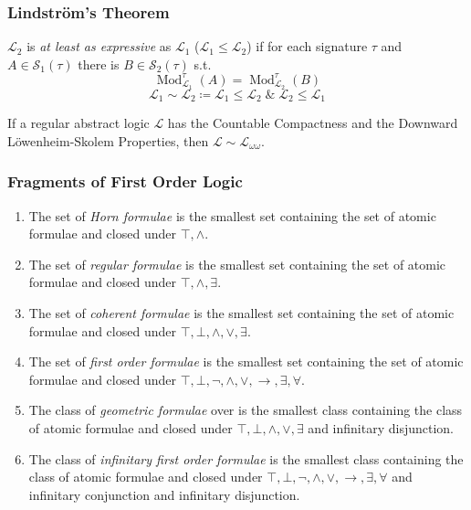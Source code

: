 \documentclass[UTF8,aspectratio=43,11pt,colorlinks,compress,openany]{beamer}%
\begin{document}
\begin{frame}\frametitle{Lindstr\"om's Theorem}
	\begin{definition}
		$\mathcal{L}_2$ is \emph{at least as expressive} as $\mathcal{L}_1$ ($\mathcal{L}_1\leq \mathcal{L}_2$) if for each signature $\tau$ and $A\in \mathcal{S}_1(\tau)$ there is $B\in \mathcal{S}_2(\tau)$ s.t.
		\[\operatorname{Mod}_{\mathcal{L}_1}^\tau(A)=\operatorname{Mod}_{\mathcal{L}_2}^\tau(B)\]
		\[\mathcal{L}_1\sim\mathcal{L}_2\coloneqq \mathcal{L}_1\leq\mathcal{L}_2\;\&\;\mathcal{L}_2\leq\mathcal{L}_1\]
	\end{definition}
	\begin{theorem}
		If a regular abstract logic $\mathcal{L}$ has the Countable Compactness and the Downward L\"owenheim-Skolem Properties, then $\mathcal{L}\sim\mathcal{L}_{\omega\omega}$.
	\end{theorem}
\end{frame}

\begin{frame}\frametitle{Fragments of First Order Logic}
\begin{enumerate}
	\item The set of \emph{Horn formulae} is the smallest set containing the set of atomic formulae and closed under $\top,\wedge$.
	\item The set of \emph{regular formulae} is the smallest set containing the set of atomic formulae and closed under $\top,\wedge,\exists$.
	\item The set of \emph{coherent formulae} is the smallest set containing the set of atomic formulae and closed under $\top,\bot,\wedge,\vee,\exists$.
	\item The set of \emph{first order formulae} is the smallest set containing the set of atomic formulae and closed under $\top,\bot,\neg,\wedge,\vee,\to,\exists,\forall$.
	\item The class of \emph{geometric formulae} over is the smallest class containing the class of atomic formulae and closed under $\top,\bot,\wedge,\vee,\exists$ and infinitary disjunction.
	\item The class of \emph{infinitary first order formulae} is the smallest class containing the class of atomic formulae and closed under $\top,\bot,\neg,\wedge,\vee,\to,\exists,\forall$ and infinitary conjunction and infinitary disjunction.
\end{enumerate}
\end{frame}
\end{document}
